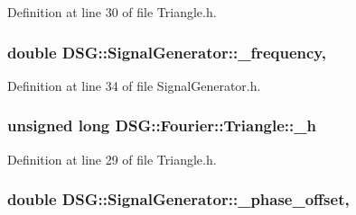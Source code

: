 Definition at line 30 of file Triangle.\-h.

\hypertarget{classDSG_1_1SignalGenerator_a67e296e3506dcdf09402c667cddff9ac}{
\subsubsection[{\-\_\-frequency}]{\setlength{\rightskip}{0pt plus 5cm}double D\-S\-G\-::\-Signal\-Generator\-::\-\_\-frequency\hspace{0.3cm}{\ttfamily [protected]}, {\ttfamily [inherited]}}}\label{classDSG_1_1SignalGenerator_a67e296e3506dcdf09402c667cddff9ac}


Definition at line 34 of file Signal\-Generator.\-h.

\hypertarget{classDSG_1_1Fourier_1_1Triangle_a86f099481a438238a44fe3f8a8215e4f}{
\subsubsection[{\-\_\-h}]{\setlength{\rightskip}{0pt plus 5cm}unsigned long D\-S\-G\-::\-Fourier\-::\-Triangle\-::\-\_\-h\hspace{0.3cm}{\ttfamily [protected]}}}\label{classDSG_1_1Fourier_1_1Triangle_a86f099481a438238a44fe3f8a8215e4f}


Definition at line 29 of file Triangle.\-h.

\hypertarget{classDSG_1_1SignalGenerator_a9abf9d00c798e0fdca6314f17547758a}{
\subsubsection[{\-\_\-phase\-\_\-offset}]{\setlength{\rightskip}{0pt plus 5cm}double D\-S\-G\-::\-Signal\-Generator\-::\-\_\-phase\-\_\-offset\hspace{0.3cm}{\ttfamily [protected]}, {\ttfamily [inherited]}}}\label{classDSG_1_1SignalGenerator_a9abf9d00c798e0fdca6314f17547758a}


